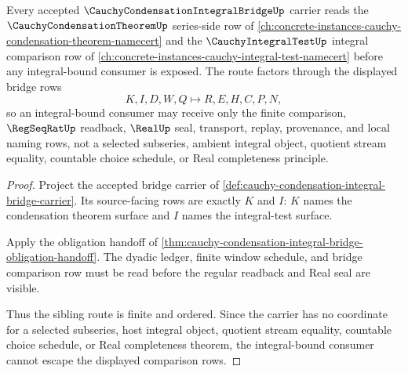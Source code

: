 \begin{theorem}
\label{thm:cauchy-condensation-integral-bridge-series-integral-sibling-route}
Every accepted $\CauchyCondensationIntegralBridgeUp$ carrier reads the $\CauchyCondensationTheoremUp$ series-side row of \autoref{ch:concrete-instances-cauchy-condensation-theorem-namecert} and the $\CauchyIntegralTestUp$ integral comparison row of \autoref{ch:concrete-instances-cauchy-integral-test-namecert} before any integral-bound consumer is exposed. The route factors through the displayed bridge rows
$$
K,I,D,W,Q \longmapsto R,E,H,C,P,N,
$$
so an integral-bound consumer may receive only the finite comparison, $\RegSeqRatUp$ readback, $\RealUp$ seal, transport, replay, provenance, and local naming rows, not a selected subseries, ambient integral object, quotient stream equality, countable choice schedule, or Real completeness principle.
\end{theorem}
\begin{proof}
Project the accepted bridge carrier of \autoref{def:cauchy-condensation-integral-bridge-carrier}. Its source-facing rows are exactly $K$ and $I$: $K$ names the condensation theorem surface and $I$ names the integral-test surface.

Apply the obligation handoff of \autoref{thm:cauchy-condensation-integral-bridge-obligation-handoff}. The dyadic ledger, finite window schedule, and bridge comparison row must be read before the regular readback and Real seal are visible.

Thus the sibling route is finite and ordered. Since the carrier has no coordinate for a selected subseries, host integral object, quotient stream equality, countable choice schedule, or Real completeness theorem, the integral-bound consumer cannot escape the displayed comparison rows.
\end{proof}
